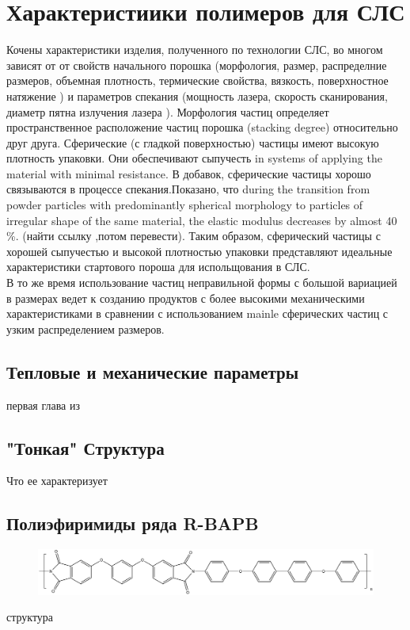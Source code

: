 \section{Характеристиики полимеров для СЛС}
Кочены характеристики изделия, полученного по технологии СЛС, во многом зависят от от свойств начального порошка (морфология, размер, распределние размеров, объемная плотность, термические свойства, вязкость, поверхностное натяжение )  и параметров спекания (мощность лазера, скорость сканирования, диаметр пятна излучения лазера ). Морфология частиц определяет пространственное расположение частиц порошка (stacking degree) относительно друг друга. Сферические (с гладкой поверхностью) частицы имеют высокую плотность упаковки. Они обеспечивают  сыпучесть in systems of applying the material with minimal resistance. В добавок, сферические частицы хорошо связываются в процессе спекания.Показано, что 
during the transition from powder particles with predominantly spherical morphology to particles of irregular shape of the same material, the elastic modulus decreases by almost 40 \%. 
(найти ссылку ,потом перевести).
Таким образом, сферический частицы с хорошей сыпучестью и высокой плотностью упаковки представляют идеальные характеристики стартового пороша для испольщования в СЛС.\\
В то же время использование частиц неправильной формы с большой вариацией в размерах ведет к созданию продуктов с более высокими механическими характеристиками в сравнении с использованием mainle сферических частиц с узким распределением размеров.

\subsection{Тепловые и механические параметры}
первая глава из
\cite{termopols}


\subsection{"Тонкая" Структура}
Что ее характеризует


\subsection{Полиэфиримиды ряда R-BAPB }
		
	\begin{figure}[h]
	\includegraphics[width=\textwidth]{fig/formula.png}
	\end{figure}
	структура


